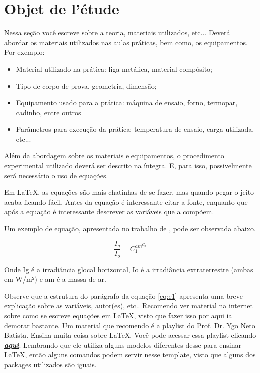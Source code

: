 \chapter{Objet de l’étude}\label{chapter:objet}

Nessa seção você escreve sobre a teoria, materiais utilizados, etc... Deverá abordar os materiais utilizados nas aulas práticas, bem como, os equipamentos. Por exemplo:
\begin{itemize}
    \item Material utilizado na prática: liga metálica, material compósito;
    \item Tipo de corpo de prova, geometria, dimensão;
    \item Equipamento usado para a prática: máquina de ensaio, forno, termopar, cadinho, entre outros
    \item  Parâmetros para execução da prática: temperatura de ensaio, carga utilizada, etc...
\end{itemize}

Além da abordagem sobre os materiais e equipamentos, o procedimento experimental utilizado deverá ser descrito na íntegra. E, para isso, possivelmente será necessário o uso de equações.

Em LaTeX, as equações são mais chatinhas de se fazer, mas quando pegar o jeito acaba ficando fácil. Antes da equação é interessante citar a fonte, enquanto que após a equação é interessante descrever as variáveis que a compõem.

Um exemplo de equação, apresentada no trabalho de , pode ser observada abaixo.

\begin{equation}
\frac{I_g}{I_o} = C_1^{am^{C_2}}
\label{eq:e1}
\end{equation}

Onde Ig é a irradiância glocal horizontal, Io é a irradiância extraterrestre (ambas em W/m²) e am é a massa de ar.

Observe que a estrutura do parágrafo da equação \ref{eq:e1} apresenta uma breve explicação sobre as variáveis, autor(es), etc.. Recomendo ver material na internet sobre como se escreve equações em LaTeX, visto que fazer isso por aqui ia demorar bastante. Um material que recomendo é a playlist do Prof. Dr. Ygo Neto Batista. Ensina muita coisa sobre LaTeX. Você pode acessar essa playlist clicando \href{https://www.youtube.com/playlist?list=PLXQryIxlA5TAuSzx0IhXpue_8a3htOm8v}{\underline{\textit{\textbf{aqui}}}}. Lembrando que ele utiliza alguns modelos diferentes desse para ensinar LaTeX, então alguns comandos podem servir nesse template, visto que alguns dos packages utilizados são iguais.